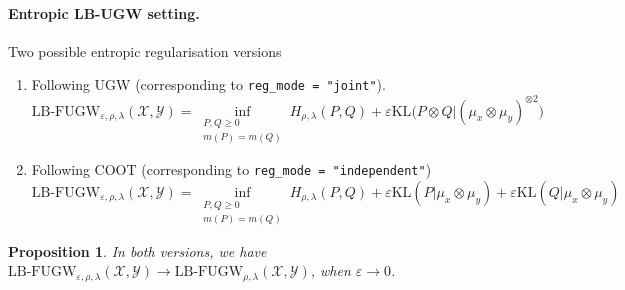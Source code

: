 \documentclass{article}
\newtheorem{proposition}[theorem]{Proposition}
\theoremstyle{remark}
\begin{document}
\paragraph{Entropic LB-UGW setting.} Two possible entropic regularisation versions
\begin{enumerate}
    \item Following UGW (corresponding to \texttt{reg\_mode = "joint"}).
    \begin{equation}
        \label{ent_ugw}
       \text{LB-FUGW}_{\varepsilon, \rho, \lambda}(\mathcal X, \mathcal Y) = \inf_{\substack{P,Q \geq 0 \\ m(P) = m(Q)}} H_{\rho, \lambda}(P,Q) + \varepsilon \text{KL}\big( P \otimes Q \vert (\mu_x \otimes \mu_y)^{\otimes 2} \big)
    \end{equation}
    
    \item Following COOT (corresponding to \texttt{reg\_mode = "independent"})
    \begin{equation}
        \label{ent_coot}
       \text{LB-FUGW}_{\varepsilon, \rho, \lambda}(\mathcal X, \mathcal Y) = \inf_{\substack{P,Q \geq 0 \\ m(P) = m(Q)}} H_{\rho, \lambda}(P,Q) + \varepsilon \text{KL}( P \vert \mu_x \otimes \mu_y) + \varepsilon \text{KL}( Q \vert \mu_x \otimes \mu_y)
    \end{equation}    
\end{enumerate}
\begin{proposition}
    In both versions, we have 
    $\text{LB-FUGW}_{\varepsilon, \rho, \lambda}(\mathcal X, \mathcal Y) \to \text{LB-FUGW}_{\rho, \lambda}(\mathcal X, \mathcal Y)$, 
    when $\varepsilon \to 0$.
\end{proposition}
\end{document}
